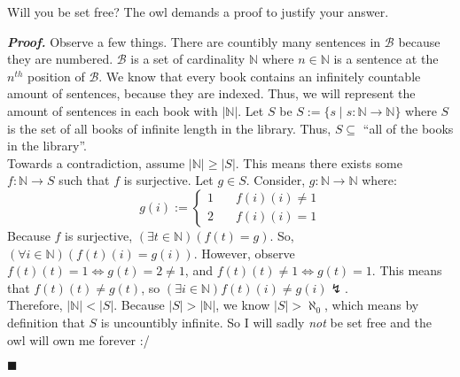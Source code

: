 \documentclass[11pt,a4paper]{article}
\begin{document}
\begin{enumerate}
    Will you be set free? The owl demands a proof to justify your answer. 

    \emph{\textbf{Proof.}} Observe a few things. There are countibly many sentences in  $\mathscr{B} $ because they are numbered.  $\mathscr{B} $ is a set of cardinality $\mathbb{N}  $ where $n \in \mathbb{N} $ is a sentence at the $n^{th}$ position of $\mathscr{B} $. We know that every book contains an infinitely countable amount of sentences, because they are indexed. Thus, we will represent the amount of sentences in each book with $|\mathbb{N}| $. Let  $S $ be $S := \{s \mid s: \mathbb{N} \rightarrow \mathbb{N} \} $ where $S$ is the set of all books of infinite length in the library.
    Thus, $S \subseteq  $ ``all of the books in the library''. \\
    Towards a contradiction, assume $|\mathbb{N}| \geq |S|  $. This means there exists some $f: \mathbb{N} \rightarrow S $ such that $f $ is surjective. Let $g \in S$. Consider, $g: \mathbb{N} \rightarrow \mathbb{N} $ where:
    $$
    g(i) :=
    \begin{cases}
        1 &\quad f(i)(i) \neq 1 \\
        2 &\quad f(i)(i) = 1
    \end{cases}
    $$
    Because  $f $ is surjective, $(\exists t \in \mathbb{N})(f(t) = g) $. So, $(\forall i \in \mathbb{N})(f(t)(i) = g(i)) $. However, observe $f(t)(t) = 1 \Leftrightarrow g(t) = 2 \neq 1 $, and $f(t)(t) \neq 1 \Leftrightarrow g(t) = 1 $.        
    This means that  $f(t)(t) \neq g(t) $, so $(\exists i \in \mathbb{N}) f(t)(i) \neq g(i) \lightning$. \\
    Therefore, $|\mathbb{N}| < |S| $. Because $|S| > |\mathbb{N}| $, we know $|S| > \aleph_0 $, which means by definition that $S $ is uncountibly infinite. So I will sadly \emph{not} be set free and the owl will own me forever :/
    \begin{flushright}
        $\blacksquare$
    \end{flushright} 

\end{enumerate}
\end{document}
